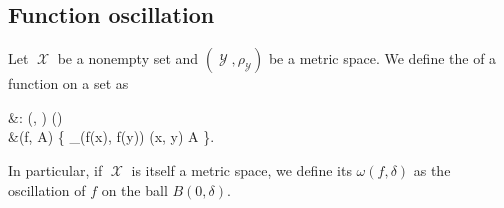 \subsection{Function oscillation}\label{subsec:function_oscillation}

\begin{definition}\label{def:function_oscillation}
  Let \( \mscrX \) be a nonempty set and \( (\mscrY, \rho_{\mscrY}) \) be a metric space. We define the  of a function on a set as
  \begin{balign*}
     &\omega: \fun(\mscrX, \mscrY) \times \pow(\mscrX) \to [0, \infty] \\
     &\omega(f, A) \coloneqq \sup \Big\{ \rho_{\mscrY}(f(x), f(y)) \colon (x, y) \in A \Big\}.
  \end{balign*}

  In particular, if \( \mscrX \) is itself a metric space, we define its  \( \omega(f, \delta) \) as the oscillation of \( f \) on the ball \( B(0, \delta) \).
\end{definition}

